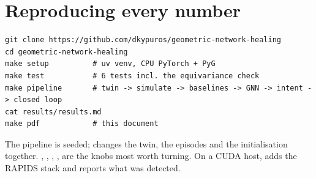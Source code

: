\chapter{Reproducing every number}
\label{app:repro}
\begin{lstlisting}
git clone https://github.com/dkypuros/geometric-network-healing
cd geometric-network-healing
make setup          # uv venv, CPU PyTorch + PyG
make test           # 6 tests incl. the equivariance check
make pipeline       # twin -> simulate -> baselines -> GNN -> intent -> closed loop
cat results/results.md
make pdf            # this document
\end{lstlisting}
The pipeline is seeded;  changes the twin, the episodes and the initialisation
together. , , , ,  are the
knobs most worth turning. On a CUDA host,  adds the RAPIDS stack and
 reports what was detected.
